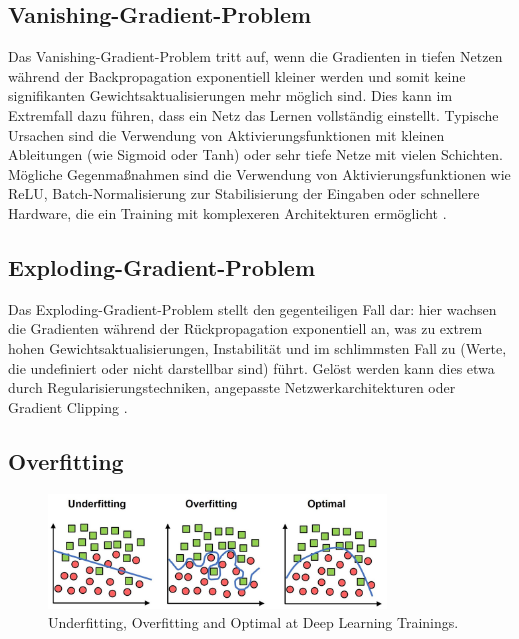 \subsection{Vanishing-Gradient-Problem}

Das Vanishing-Gradient-Problem tritt auf, wenn die Gradienten in tiefen Netzen während der Backpropagation exponentiell kleiner werden und somit keine signifikanten Gewichtsaktualisierungen mehr möglich sind. Dies kann im Extremfall dazu führen, dass ein Netz das Lernen vollständig einstellt. Typische Ursachen sind die Verwendung von Aktivierungsfunktionen mit kleinen Ableitungen (wie Sigmoid oder Tanh) oder sehr tiefe Netze mit vielen Schichten. Mögliche Gegenmaßnahmen sind die Verwendung von Aktivierungsfunktionen wie \acrshort{ReLU}, Batch-Normalisierung zur Stabilisierung der Eingaben oder schnellere Hardware, die ein Training mit komplexeren Architekturen ermöglicht \cite{Alzubaidi2021}.  

\subsection{Exploding-Gradient-Problem}

Das Exploding-Gradient-Problem stellt den gegenteiligen Fall dar: hier wachsen die Gradienten während der Rückpropagation exponentiell an, was zu extrem hohen Gewichtsaktualisierungen, Instabilität und im schlimmsten Fall zu  (Werte, die undefiniert oder nicht darstellbar sind) führt. Gelöst werden kann dies etwa durch Regularisierungstechniken, angepasste Netzwerkarchitekturen oder Gradient Clipping \cite{Alzubaidi2021}.  

\subsection{Overfitting}
\label{subsec:overfitting}

\begin{figure}[h]
    \centering
    \includegraphics[width=0.8\textwidth]{images/011Fundamentals/overfitting.jpg}
    \caption{Underfitting, Overfitting and Optimal at Deep Learning Trainings. \cite{overfitting_pic} }
    \label{fig:overfitting}
\end{figure}


